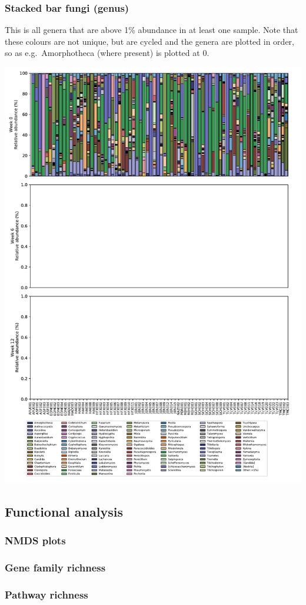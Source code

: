 \documentclass[
]{article}
\begin{document}
\hypertarget{stacked-bar-fungi-genus}{%
\subsubsection{Stacked bar fungi
(genus)}\label{stacked-bar-fungi-genus}}

This is all genera that are above 1\% abundance in at least one sample.
Note that these colours are not unique, but are cycled and the genera
are plotted in order, so as e.g.~Amorphotheca (where present) is plotted
at 0.

\includegraphics{Fungal-metagenome_files/figure-latex/all_genus-1.pdf}

\hypertarget{functional-analysis}{%
\subsection{Functional analysis}\label{functional-analysis}}

\hypertarget{nmds-plots}{%
\subsubsection{NMDS plots}\label{nmds-plots}}

\hypertarget{gene-family-richness}{%
\subsubsection{Gene family richness}\label{gene-family-richness}}

\hypertarget{pathway-richness}{%
\subsubsection{Pathway richness}\label{pathway-richness}}
\end{document}
